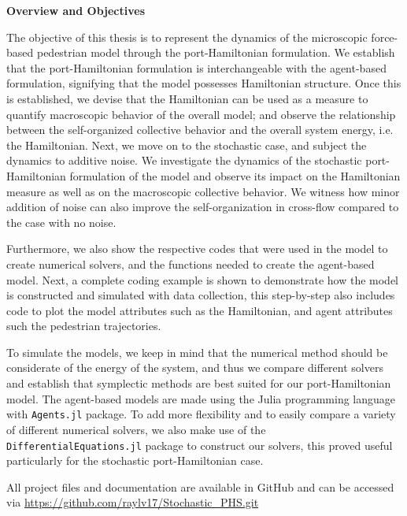 \textbf{Overview and Objectives}

The objective of this thesis is to represent the dynamics of the microscopic force-based pedestrian model through the port-Hamiltonian formulation. We establish that the port-Hamiltonian formulation is interchangeable with the agent-based formulation, signifying that the model possesses Hamiltonian structure. Once this is established, we devise that the Hamiltonian can be used as a measure to quantify macroscopic behavior of the overall model; and observe the relationship between the self-organized collective behavior and the overall system energy, i.e. the Hamiltonian. Next, we move on to the stochastic case, and subject the dynamics to additive noise. We investigate the dynamics of the stochastic port-Hamiltonian formulation of the model and observe its impact on the Hamiltonian measure as well as on the macroscopic collective behavior. We witness how minor addition of noise can also improve the self-organization in cross-flow compared to the case with no noise.

Furthermore, we also show the respective codes that were used in the model to create numerical solvers, and the functions needed to create the agent-based model. Next, a complete coding example is shown to demonstrate how the model is constructed and simulated with data collection, this step-by-step also includes code to plot the model attributes such as the Hamiltonian, and agent attributes such the pedestrian trajectories.

To simulate the models, we keep in mind that the numerical method should be considerate of the energy of the system, and thus we compare different solvers and establish that symplectic methods are best suited for our port-Hamiltonian model. The agent-based models are made using the Julia programming language with \texttt{Agents.jl} \cite{Agents.jl} package. To add more flexibility and to easily compare a variety of different numerical solvers, we also make use of the \texttt{DifferentialEquations.jl} \cite{rackauckas2017differentialequations} package to construct our solvers, this proved useful particularly for the stochastic port-Hamiltonian case.

All project files and documentation are available in GitHub and can be accessed via \href{https://github.com/raylv17/Stochastic_PHS.git}{https://github.com/raylv17/Stochastic\_PHS.git}


